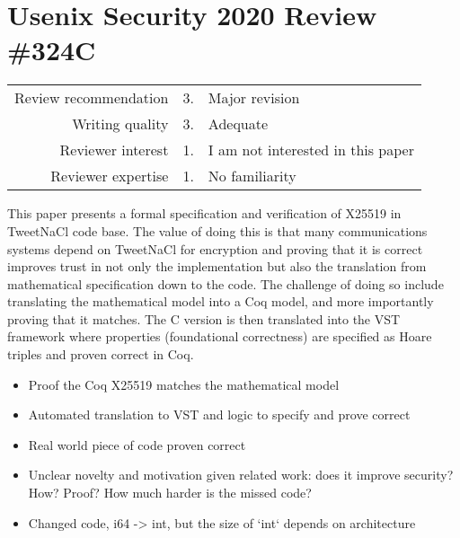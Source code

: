 \newpage
\section*{Usenix Security 2020 Review \#324C}

\begin{tabular}{rrp{}}
    \toprule
    Review recommendation & 3.& Major revision                    \\
    Writing quality       & 3.& Adequate                          \\
    Reviewer interest     & 1.& I am not interested in this paper \\
    Reviewer expertise    & 1.& No familiarity                    \\
    \bottomrule
\end{tabular}

\begin{center}
\end{center}

This paper presents a formal specification and verification of X25519 in TweetNaCl code base. The value of doing this is that many communications systems depend on TweetNaCl for encryption and proving that it is correct improves trust in not only the implementation but also the translation from mathematical specification down to the code. The challenge of doing so include translating the mathematical model into a Coq model, and more importantly proving that it matches. The C version is then translated into the VST framework where properties (foundational correctness) are specified as Hoare triples and proven correct in Coq.

\begin{center}
\end{center}

\begin{itemize}
    \item Proof the Coq X25519 matches the mathematical model
    \item Automated translation to VST and logic to specify and prove correct
    \item Real world piece of code proven correct
\end{itemize}

\begin{center}
\end{center}

\begin{itemize}
    \item Unclear novelty and motivation given related work: does it improve security? How? Proof? How much harder is the missed code?
    \item Changed code, i64 -> int, but the size of `int` depends on architecture
\end{itemize}

